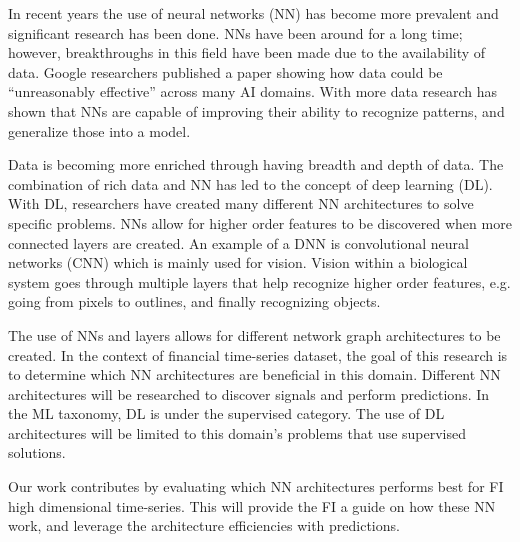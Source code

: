\documentclass[11pt]{article}
\begin{document}

In recent years the use of neural networks (NN) has become more prevalent and significant research has been done. NNs have been around for a long time; however, breakthroughs in this field have been made due to the availability of data. Google researchers \citet{Halevy2009TheData} published a paper showing how data could be ``unreasonably effective'' across many AI domains. With more data research has shown that NNs are capable of improving their ability to recognize patterns, and generalize those into a model.

Data is becoming more enriched through having breadth and depth of data. The combination of rich data and NN has led to the concept of deep learning (DL). With DL, researchers have created many different NN architectures to solve specific problems. NNs allow for higher order features to be discovered when more connected layers are created. An example of a DNN is convolutional neural networks (CNN) which is mainly used for vision. Vision within a biological system goes through multiple layers that help recognize higher order features, e.g. going from pixels to outlines, and finally recognizing objects.

The use of NNs and layers allows for different network graph architectures to be created. In the context of financial time-series dataset, the goal of this research is to determine which NN architectures are beneficial in this domain. Different NN architectures will be researched to discover signals and perform predictions. In the ML taxonomy, DL is under the supervised category. The use of DL architectures will be limited to this domain's problems that use supervised solutions.

Our work contributes by evaluating which NN architectures performs best for FI high dimensional time-series. This will provide the FI a guide on how these NN work, and leverage the architecture efficiencies with predictions.
\end{document}
